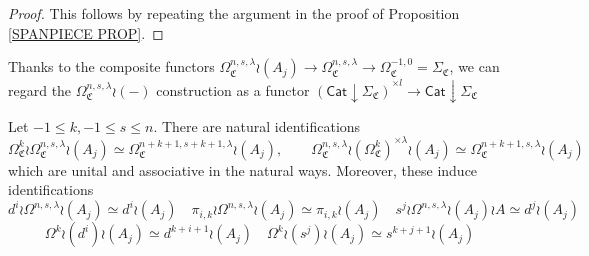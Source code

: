\documentclass[a4paper,10pt
,draft
]{article}%
\renewcommand{\1}{\eta}%
\newcommand{\OC}{\Omega_{\mathfrak C}}
\begin{document}
\begin{proof}
This follows by repeating the argument in the proof of Proposition \ref{SPANPIECE PROP}.
\end{proof}


 
Thanks to the composite functors
$\Omega_{\mathfrak{C}}^{n,s,\lambda} \wr (A_j)
\to \Omega_{\mathfrak{C}}^{n,s,\lambda} 
\to \Omega^{-1,0}_{\mathfrak{C}} = \Sigma_{\mathfrak{C}}$,
we can regard the 
$\Omega_{\mathfrak{C}}^{n,s,\lambda} \wr (-)$
construction as a functor
$\left(\mathsf{Cat}\downarrow \Sigma_{\mathfrak{C}}\right)^{\times l}
\to \mathsf{Cat}\downarrow \Sigma_{\mathfrak{C}}$

\begin{corollary}
Let $-1 \leq k, -1 \leq s \leq n$.
There are natural identifications
\[
	\OC^k \wr \OC^{n,s,\lambda} \wr (A_j) \simeq
	\OC^{n+k+1,s+k+1,\lambda} \wr (A_j),
\qquad
	\OC^{n,s,\lambda} \wr (\OC^k)^{\times \lambda} \wr (A_j) \simeq
	\OC^{n+k+1,s,\lambda} \wr (A_j)	
\]
which are unital and associative in the natural ways.
Moreover, these induce identifications
\[
d^i \wr \Omega^{n,s,\lambda} \wr (A_j) \simeq d^i \wr (A_j)
	\quad
\pi_{i,k} \wr \Omega^{n,s,\lambda} \wr (A_j) \simeq \pi_{i,k} \wr (A_j)
	\quad
s^j \wr \Omega^{n,s,\lambda} \wr (A_j) \wr A \simeq d^j \wr  (A_j)
\]
\[
\Omega^k \wr (d^i) \wr (A_j) \simeq d^{k+i+1} \wr (A_j)
	\quad
\Omega^k \wr (s^j) \wr (A_j) \simeq s^{k+j+1} \wr (A_j)
\]
\end{corollary}
\end{document}
